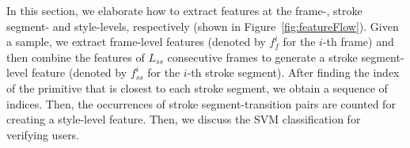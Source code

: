 %



In this section, we elaborate how to extract features at the frame-, stroke segment- and style-levels, respectively (shown in Figure~\ref{fig:featureFlow}). Given a sample, we extract frame-level features (denoted by $f_f^i$ for the $i$-th frame) and then combine the features of $L_{ss}$ consecutive frames to generate a stroke segment-level feature (denoted by $f_{ss}^i$ for the $i$-th stroke segment). After finding the index of the primitive that is closest to each stroke segment, we obtain a  sequence of indices. Then, the occurrences of stroke segment-transition pairs are counted for creating a style-level feature. Then, we discuss the SVM classification for verifying users. 



